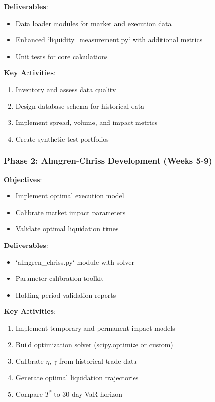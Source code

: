\documentclass[11pt,a4paper]{article}
\begin{document}
\textbf{Deliverables}:
\begin{itemize}
    \item Data loader modules for market and execution data
    \item Enhanced `liquidity\_measurement.py` with additional metrics
    \item Unit tests for core calculations
\end{itemize}

\textbf{Key Activities}:
\begin{enumerate}
    \item Inventory and assess data quality
    \item Design database schema for historical data
    \item Implement spread, volume, and impact metrics
    \item Create synthetic test portfolios
\end{enumerate}

\subsubsection{Phase 2: Almgren-Chriss Development (Weeks 5-9)}

\textbf{Objectives}:
\begin{itemize}
    \item Implement optimal execution model
    \item Calibrate market impact parameters
    \item Validate optimal liquidation times
\end{itemize}

\textbf{Deliverables}:
\begin{itemize}
    \item `almgren\_chriss.py` module with solver
    \item Parameter calibration toolkit
    \item Holding period validation reports
\end{itemize}

\textbf{Key Activities}:
\begin{enumerate}
    \item Implement temporary and permanent impact models
    \item Build optimization solver (scipy.optimize or custom)
    \item Calibrate $\eta$, $\gamma$ from historical trade data
    \item Generate optimal liquidation trajectories
    \item Compare $T^*$ to 30-day VaR horizon
\end{enumerate}
\end{document}
